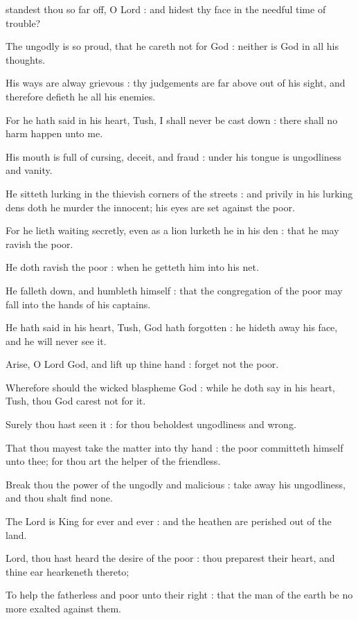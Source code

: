 

 standest thou so far off, O Lord : and hidest thy face in the needful time of trouble?\par
{}
The ungodly is so proud, that he careth not for God : neither is God in all his thoughts.\par
{}His ways are alway grievous : thy judgements are far above out of his sight, and therefore defieth he all his enemies.\par
{}For he hath said in his heart, Tush, I shall never be cast down : there shall no harm happen unto me.\par
{}His mouth is full of cursing, deceit, and fraud : under his tongue is ungodliness and vanity.\par
{}He sitteth lurking in the thievish corners of the streets : and privily in his lurking dens doth he murder the innocent; his eyes are set against the poor.\par
{}For he lieth waiting secretly, even as a lion lurketh he in his den : that he may ravish the poor.\par
{}He doth ravish the poor : when he getteth him into his net.\par
{}He falleth down, and humbleth himself : that the congregation of the poor may fall into the hands of his captains.\par
{}He hath said in his heart, Tush, God hath forgotten : he hideth away his face, and he will never see it.\par
{}Arise, O Lord God, and lift up thine hand : forget not the poor.\par
{}Wherefore should the wicked blaspheme God : while he doth say in his heart, Tush, thou God carest not for it.\par
{}Surely thou hast seen it : for thou beholdest ungodliness and wrong.\par
{}That thou mayest take the matter into thy hand : the poor committeth himself unto thee; for thou art the helper of the friendless.\par
{}Break thou the power of the ungodly and malicious : take away his ungodliness, and thou shalt find none.\par
{}The Lord is King for ever and ever : and the heathen are perished out of the land.\par
{}Lord, thou hast heard the desire of the poor : thou preparest their heart, and thine ear hearkeneth thereto;\par
{}To help the fatherless and poor unto their right : that the man of the earth be no more exalted against them.\par

